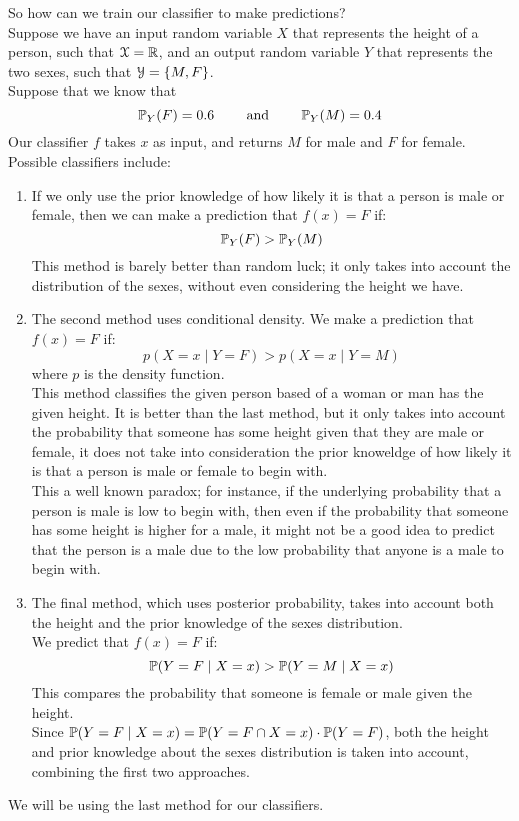 \documentclass[12pt]{article}
\begin{document}
So how can we train
our classifier to make predictions? \\
Suppose we have an input
random variable $X$
that represents the height of a person,
such that $\mathcal{X} = \mathbb{R}$,
and an output random variable $Y$
that represents the two sexes,
such that $\mathcal{Y} = \{ M, F \}$. \\
Suppose that we know that
\[ \mathbb{P}_Y(F) = 0.6 \qquad \text{ and } 
\qquad \mathbb{P}_Y(M) = 0.4 \]
Our classifier $f$ takes $x$
as input,
and returns $M$ for male and $F$
for female. \\
Possible classifiers include:
\begin{enumerate}
    \item 
    If we only use the prior knowledge
    of how likely it is that a person
    is male or female,
    then we can make a prediction
    that $f(x) = F$
    if:
    \[ \mathbb{P}_Y(F) > \mathbb{P}_Y(M) \]
    This method is barely better
    than random luck; it only takes
    into account the distribution
    of the sexes, without even considering
    the height we have.
    \item
    The second method uses conditional
    density.
    We make a prediction that $f(x) = F$
    if:
    \[ p(X = x \mid Y = F)
    > p(X = x \mid Y = M) \]
    where $p$ is the density function. \\
    This method classifies the
    given person based
    of a woman or man has the given
    height.
    It is better than the last method,
    but it only takes into account
    the probability that someone
    has some height given that they
    are male or female,
    it does not take into consideration
    the prior knoweldge of how
    likely it is that a person
    is male or female to begin with. \\
    This a well known paradox;
    for instance,
    if the underlying probability
    that a person is male is low
    to begin with,
    then even if the probability
    that someone has some height
    is higher for a male,
    it might not be a good idea
    to predict that the person 
    is a male due to the low
    probability that anyone
    is a male to begin with. 
    \item
    The final method,
    which uses posterior probability,
    takes into account both
    the height and the prior knowledge
    of the sexes distribution. \\
    We predict that $f(x) = F$
    if:
    \[ \mathbb{P}(Y = F \mid X = x)
    > \mathbb{P}(Y = M \mid X = x) \]
    This compares the probability
    that someone is female or male
    given the height. \\
    Since $\mathbb{P}(Y = F \mid X = x)
    = \mathbb{P}(Y = F \cap X = x) 
    \cdot \mathbb{P}(Y = F)$,
    both the height and prior knowledge
    about the sexes distribution
    is taken into account,
    combining the first two approaches.
\end{enumerate}
We will be using the last method
for our classifiers. \\
\end{document}
